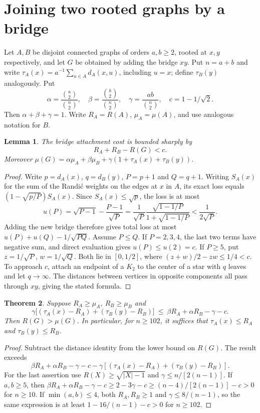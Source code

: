 \documentclass[11pt,a4paper]{article}
\newtheorem{theorem}{Theorem}[section]
\newtheorem{lemma}[theorem]{Lemma}\newtheorem{corollary}[theorem]{Corollary}
\begin{document}
\section{Joining two rooted graphs by a bridge}
Let $A,B$ be disjoint connected graphs of orders $a,b\ge2$, rooted at
$x,y$ respectively, and let $G$ be obtained by adding the bridge $xy$.
Put $n=a+b$ and write $\tau_A(x)=a^{-1}\sum_{u\in A}d_A(x,u)$,
including $u=x$; define $\tau_B(y)$ analogously. Put
\[
 \alpha=\frac{\binom a2}{\binom n2},\quad
 \beta=\frac{\binom b2}{\binom n2},\quad
 \gamma=\frac{ab}{\binom n2},\quad c=1-1/\sqrt2 .
\]
Then $\alpha+\beta+\gamma=1$. Write $R_A=R(A)$, $\mu_A=\mu(A)$,
and use analogous notation for $B$.
\begin{lemma}\label{p08-lem:bridgesharp}
The bridge attachment cost is bounded sharply by
\[
 R_A+R_B-R(G)<c.
\]
Moreover $\mu(G)=\alpha\mu_A+\beta\mu_B+
\gamma(1+\tau_A(x)+\tau_B(y))$.
\end{lemma}
\begin{proof}
Write $p=d_A(x)$, $q=d_B(y)$, $P=p+1$ and $Q=q+1$.
Writing $S_A(x)$ for the sum of the Randi\'c weights on the edges at
$x$ in $A$, its exact loss equals $(1-\sqrt{p/P})S_A(x)$.
Since $S_A(x)\le\sqrt p$, the loss is at most
\[
 u(P)=\sqrt{P-1}-\frac{P-1}{\sqrt P}
     =\frac{1}{\sqrt P}
       \frac{\sqrt{1-1/P}}{1+\sqrt{1-1/P}}<\frac1{2\sqrt P}.
\]
Adding the new bridge therefore gives total loss at most
$u(P)+u(Q)-1/\sqrt{PQ}$. Assume $P\le Q$. If $P=2,3,4$, the last
two terms have negative sum, and direct evaluation gives
$u(P)\le u(2)=c$. If $P\ge5$, put $z=1/\sqrt P$, $w=1/\sqrt Q$.
Both lie in $[0,1/2]$, where $(z+w)/2-zw\le1/4<c$.
To approach $c$, attach an endpoint of a $K_2$ to the center of a star
with $q$ leaves and let $q\to\infty$. The distances between vertices in
opposite components all pass through $xy$, giving the stated formula.
\end{proof}
\begin{theorem}\label{p08-thm:rootsglue}
Suppose $R_A\ge\mu_A$, $R_B\ge\mu_B$ and
\[
 \gamma\big[(\tau_A(x)-R_A)+(\tau_B(y)-R_B)\big]
 \ \le\ \beta R_A+\alpha R_B-\gamma-c .
\]
Then $R(G)>\mu(G)$. In particular, for $n\ge102$, it suffices
that $\tau_A(x)\le R_A$ and $\tau_B(y)\le R_B$.
\end{theorem}
\begin{proof}
Subtract the distance identity from the lower bound on $R(G)$.
The result exceeds
\[
 \beta R_A+\alpha R_B-\gamma-c
   -\gamma[(\tau_A(x)-R_A)+(\tau_B(y)-R_B)] .
\]
For the last assertion use $R(X)\ge\sqrt{|X|-1}$ and
$\gamma\le n/[2(n-1)]$. If $a,b\ge5$, then
$\beta R_A+\alpha R_B-\gamma-c\ge2-3\gamma-c
\ge(n-4)/[2(n-1)]-c>0$ for $n\ge10$.
If $\min(a,b)\le4$, both $R_A,R_B\ge1$ and $\gamma\le8/(n-1)$,
so the same expression is at least $1-16/(n-1)-c>0$ for $n\ge102$.
\end{proof}
\end{document}
